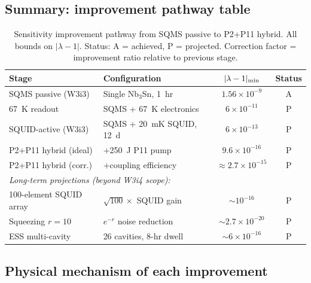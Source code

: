 \documentclass[11pt,twocolumn]{article}
\newcommand{\lam}{\lambda}
\newcommand{\ee}[1]{\times 10^{#1}}
\theoremstyle{definition}
\theoremstyle{remark}
\begin{document}
\subsection{Summary: improvement pathway table}
\label{sec:pathway_table}

\begin{table}[H]
\caption{Sensitivity improvement pathway from SQMS passive to P2+P11 hybrid.
All bounds on $|\lam-1|$. Status: A = achieved, P = projected.
Correction factor = improvement ratio relative to previous stage.}
\label{tab:pathway}
\begin{tabular}{@{}llcc@{}}
\toprule
Stage & Configuration & $|\lam-1|_{\rm min}$ & Status \\
\midrule
SQMS passive (W3i3) & Single Nb$_3$Sn, 1~hr & $1.56\ee{-9}$ & A \\
67~K readout & SQMS + 67~K electronics & $6\ee{-11}$ & P \\
SQUID-active (W3i3) & SQMS + 20~mK SQUID, 12~d & $6\ee{-13}$ & P \\
P2+P11 hybrid (ideal) & +250~J P11 pump & $9.6\ee{-16}$ & P \\
P2+P11 hybrid (corr.) & +coupling efficiency & $\approx 2.7\ee{-15}$ & P \\
\midrule
\multicolumn{4}{l}{\textit{Long-term projections (beyond W3i4 scope):}} \\
100-element SQUID array & $\sqrt{100}\times$ SQUID gain & $\sim 10^{-16}$ & P \\
Squeezing $r = 10$ & $e^{-r}$ noise reduction & $\sim 2.7\ee{-20}$ & P \\
ESS multi-cavity & 26 cavities, 8-hr dwell & $\sim 6\ee{-16}$ & P \\
\bottomrule
\end{tabular}
\end{table}

\subsection{Physical mechanism of each improvement}
\label{sec:mechanisms}
\end{document}
